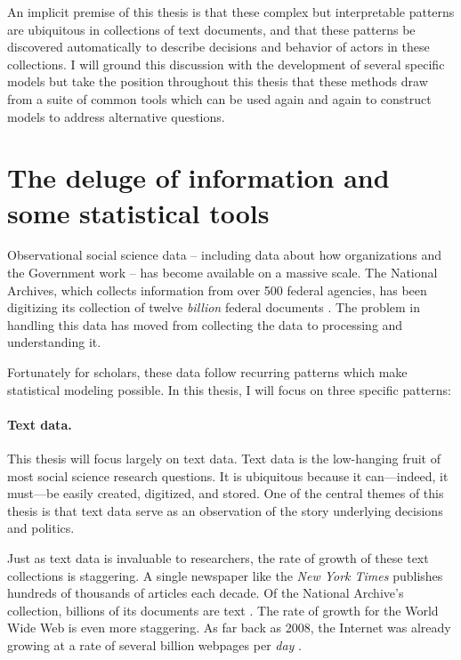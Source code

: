 An implicit premise of this thesis is that these complex but
interpretable patterns are ubiquitous in collections of text
documents, and that these patterns be discovered automatically to
describe decisions and behavior of actors in these collections.  I will
ground this discussion with the development of several specific models
but take the position throughout this thesis that these methods draw
from a suite of common tools which can be used again and again to
construct models to address alternative questions.

\section*{The deluge of information and some statistical tools}

Observational social science data -- including data about how
organizations and the Government work -- has become available on a
massive scale. The National Archives, which collects information from
over 500 federal agencies, has been digitizing its collection of
twelve \emph{billion} federal documents \citep{lazer:2009,
  national_archives:2012a,national_archives:2012b}.  The problem in
handling this data has moved from collecting the data to processing
and understanding it.

Fortunately for scholars, these data follow recurring patterns which
make statistical modeling possible. In this thesis, I will focus on
three specific patterns:

\paragraph{Text data.} This thesis will focus largely on text data.
Text data is the low-hanging fruit of most social science research
questions.  It is ubiquitous because it can---indeed, it must---be
easily created, digitized, and stored. One of the central themes of
this thesis is that text data serve as an observation of the story
underlying decisions and politics.

Just as text data is invaluable to researchers, the rate of growth of
these text collections is staggering.  A single newspaper like the
\emph{New York Times} publishes hundreds of thousands of articles each
decade.  Of the National Archive's collection, billions of its
documents are text
\citep{national_archives:2012a,national_archives:2012b}.  The rate of
growth for the World Wide Web is even more staggering.  As far back as
2008, the Internet was already growing at a rate of several billion
webpages per \emph{day} \citep{googleblog:2008}.

